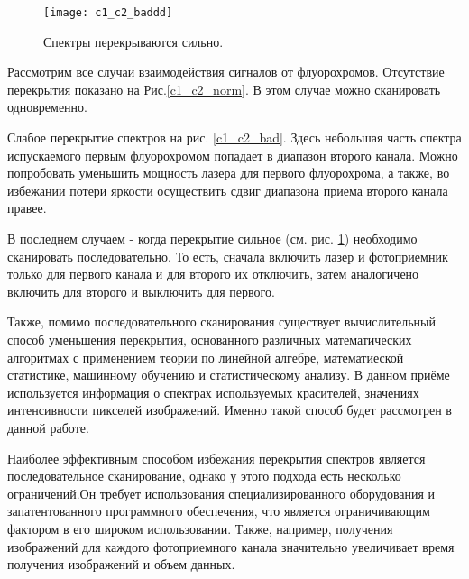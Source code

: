 \begin{figure}[H]
	\centering
	\texttt{[image: c1\_c2\_baddd]}
	\caption{Спектры перекрываются сильно.}
	\label{c1_c2_baddd}
\end{figure}


Рассмотрим все случаи взаимодействия сигналов от
флуорохромов. Отсутствие перекрытия показано на Рис.\ref{c1_c2_norm}. В этом случае можно сканировать одновременно.\cite{Inbook}

Слабое перекрытие спектров на рис. \ref{c1_c2_bad}. Здесь небольшая часть
спектра испускаемого первым флуорохромом попадает в диапазон второго канала. Можно попробовать уменьшить мощность лазера для первого флуорохрома, а также, во избежании потери яркости осуществить сдвиг диапазона приема второго канала правее.\cite{Inbook}

В последнем случаем - когда перекрытие сильное (см. рис. \ref{c1_c2_baddd}) необходимо сканировать последовательно. То есть, сначала включить лазер и фотоприемник только для первого канала и для второго их отключить, затем аналогичено включить для второго и выключить для первого. \cite{Inbook}
 
Также, помимо последовательного сканирования существует вычислительный способ уменьшения перекрытия, основанного различных математических алгоритмах с применением теории по линейной алгебре, математиеской статистике, машинному обучению и статистическому анализу. В данном приёме используется информация о спектрах используемых красителей, значениях интенсивности пикселей изображений.\cite{Inbook} Именно такой способ будет рассмотрен в данной работе.

Наиболее эффективным способом избежания перекрытия спектров является последовательное сканирование, однако у этого подхода есть несколько ограничений.Он требует использования специализированного оборудования и запатентованного программного обеспечения, что является ограничивающим фактором в его широком использовании. Также, например, получения изображений для каждого фотоприемного канала значительно увеличивает время получения изображений и объем данных. \cite{Conference}





%
